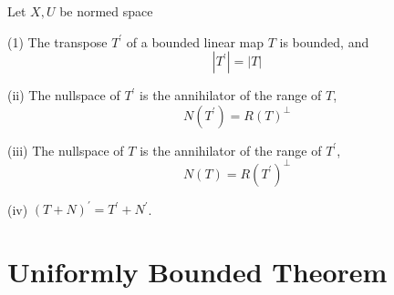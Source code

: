 \documentclass[12pt, oneside]{book}
\begin{document}
\begin{theorem}
    Let $X,U$ be normed space

    (1) The transpose $T^{\prime}$ of a bounded linear map $T$ is bounded, and
    \begin{equation*}
        \left|T^{\prime}\right|=|T|
    \end{equation*}

    (ii) The nullspace of $T^{\prime}$ is the annihilator of the range of $T$,
    \begin{equation*}
        N\left(T^{\prime}\right)=R\left(T\right)^{\perp}
    \end{equation*}

    (iii) The nullspace of $T$ is the annihilator of the range of $T^{\prime}$,
    \begin{equation*}
        N\left(T\right)
        =
        R\left(T^{\prime}\right)^{\perp}
    \end{equation*}

    (iv) $(T+ {N})^{\prime}=T^{\prime}+ {N}^{\prime}$.
\end{theorem}



\section{Uniformly Bounded Theorem}
\end{document}

